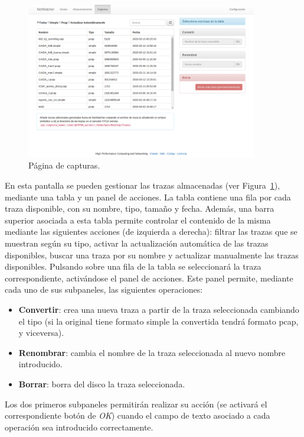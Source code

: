 \begin{figure}[!htp]
  \centering
  \includegraphics[width=0.9\textwidth,clip=true]{graphics/capturas/capturas}
  \caption{Página de capturas.}
  \label{fig:captura:capturas}
\end{figure}

En esta pantalla se pueden gestionar las \glspl{traza} almacenadas (ver Figura~\ref{fig:captura:capturas}), mediante una tabla y un panel de acciones.
La tabla contiene una fila por cada \gls{traza} disponible, con su nombre, tipo, tamaño y fecha. Además, una barra superior asociada a esta tabla permite controlar el contenido de la misma mediante las siguientes acciones (de izquierda a derecha): filtrar las \glspl{traza} que se muestran según su tipo, activar la actualización automática de las \glspl{traza} disponibles, buscar una \gls{traza} por su nombre y actualizar manualmente las \glspl{traza} disponibles.
Pulsando sobre una fila de la tabla se seleccionará la \gls{traza} correspondiente, activándose el panel de acciones.
Este panel permite, mediante cada uno de sus subpaneles, las siguientes operaciones:
\begin{itemize}
  \item \textbf{Convertir}: crea una nueva \gls{traza} a partir de la \gls{traza} seleccionada cambiando el tipo (si la original tiene formato \gls{simple} la convertida tendrá formato \gls{pcap}, y viceversa).
  \item \textbf{Renombrar}: cambia el nombre de la \gls{traza} seleccionada al nuevo nombre introducido.
  \item \textbf{Borrar}: borra del disco la \gls{traza} seleccionada.
\end{itemize}

Los dos primeros subpaneles permitirán realizar su acción (se activará el correspondiente botón de \textit{OK}) cuando el campo de texto asociado a cada operación sea introducido correctamente.


